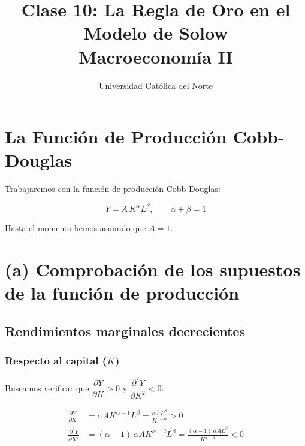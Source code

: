 \documentclass[11pt,a4paper]{article}
\title{\textbf{Clase 10: La Regla de Oro en el Modelo de Solow} \\ \large Macroeconomía II}
\author{Universidad Católica del Norte}
\date{}
\begin{document}
\maketitle
\tableofcontents
\newpage

\section{La Función de Producción Cobb-Douglas}

Trabajaremos con la función de producción Cobb-Douglas:

\begin{resultadobox}
\begin{equation}
    Y = A \, K^{\alpha} L^{\beta}, \qquad \alpha + \beta = 1
\end{equation}
\end{resultadobox}

\begin{notabox}[Supuesto]
Hasta el momento hemos asumido que $A = 1$.
\end{notabox}

\section{(a) Comprobación de los supuestos de la función de producción}

\subsection{Rendimientos marginales decrecientes}

\subsubsection{Respecto al capital ($K$)}

Buscamos verificar que $\dfrac{\partial Y}{\partial K} > 0$ y $\dfrac{\partial^2 Y}{\partial K^2} < 0$.

\begin{align}
    \frac{\partial Y}{\partial K} &= \alpha A K^{\alpha-1} L^{\beta} = \frac{\alpha A L^{\beta}}{K^{1-\alpha}} > 0 \\[6pt]
    \frac{\partial^2 Y}{\partial K^2} &= (\alpha-1)\,\alpha A K^{\alpha-2} L^{\beta} = \frac{(\alpha-1)\,\alpha A L^{\beta}}{K^{2-\alpha}} < 0
\end{align}
\end{document}
